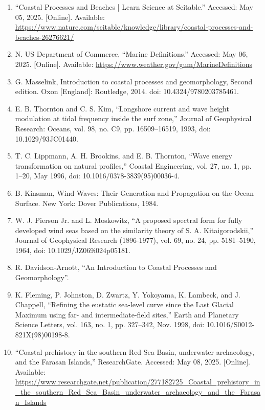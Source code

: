 \documentclass{article}
\begin{document}
\begin{sloppypar}
\begin{enumerate}
    \item{“Coastal Processes and Beaches | Learn Science at Scitable.” Accessed: May 05, 2025. [Online]. Available: \url{https://www.nature.com/scitable/knowledge/library/coastal-processes-and-beaches-26276621/}}

    \item{N. US Department of Commerce, “Marine Definitions.” Accessed: May 06, 2025. [Online]. Available: \url{https://www.weather.gov/gum/MarineDefinitions}}

    \item{G. Masselink, Introduction to coastal processes and geomorphology, Second edition. Oxon [England]: Routledge, 2014. doi: 10.4324/9780203785461.}

    \item{E. B. Thornton and C. S. Kim, “Longshore current and wave height modulation at tidal frequency inside the surf zone,” Journal of Geophysical Research: Oceans, vol. 98, no. C9, pp. 16509–16519, 1993, doi: 10.1029/93JC01440.}

    \item{T. C. Lippmann, A. H. Brookins, and E. B. Thornton, “Wave energy transformation on natural profiles,” Coastal Engineering, vol. 27, no. 1, pp. 1–20, May 1996, doi: 10.1016/0378-3839(95)00036-4.}

    \item{B. Kinsman, Wind Waves: Their Generation and Propagation on the Ocean Surface. New York: Dover Publications, 1984.}

    \item{W. J. Pierson Jr. and L. Moskowitz, “A proposed spectral form for fully developed wind seas based on the similarity theory of S. A. Kitaigorodskii,” Journal of Geophysical Research (1896-1977), vol. 69, no. 24, pp. 5181–5190, 1964, doi: 10.1029/JZ069i024p05181.}

    \item{R. Davidson-Arnott, “An Introduction to Coastal Processes and Geomorphology”.}

    \item{K. Fleming, P. Johnston, D. Zwartz, Y. Yokoyama, K. Lambeck, and J. Chappell, “Refining the eustatic sea-level curve since the Last Glacial Maximum using far- and intermediate-field sites,” Earth and Planetary Science Letters, vol. 163, no. 1, pp. 327–342, Nov. 1998, doi: 10.1016/S0012-821X(98)00198-8.}

     \item{“Coastal prehistory in the southern Red Sea Basin, underwater archaeology, and the Farasan Islands,” ResearchGate. Accessed: May 08, 2025. [Online]. Available: \url{https://www.researchgate.net/publication/277182725_Coastal_prehistory_in_the_southern_Red_Sea_Basin_underwater_archaeology_and_the_Farasan_Islands}}


\end{enumerate}
\end{sloppypar}
\end{document}
